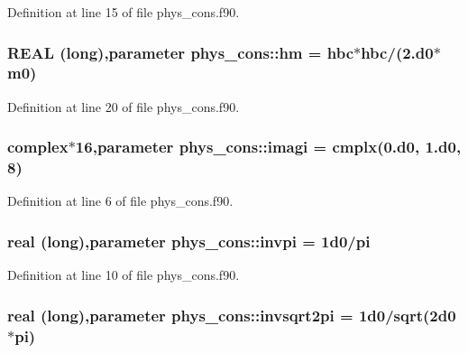 Definition at line 15 of file phys\_\-cons.f90.

\hypertarget{namespacephys__cons_ad97ad749ef4f8f66c56a0facb7394cb5}{
\subsubsection[{hm}]{\setlength{\rightskip}{0pt plus 5cm}REAL (long),parameter {\bf phys\_\-cons::hm} = {\bf hbc}$\ast${\bf hbc}/(2.d0$\ast${\bf m0})}}
\label{namespacephys__cons_ad97ad749ef4f8f66c56a0facb7394cb5}


Definition at line 20 of file phys\_\-cons.f90.

\hypertarget{namespacephys__cons_a0dbb22856790b16e206de451e9cdd74a}{
\subsubsection[{imagi}]{\setlength{\rightskip}{0pt plus 5cm}complex$\ast$16,parameter {\bf phys\_\-cons::imagi} = cmplx(0.d0, 1.d0, 8)}}
\label{namespacephys__cons_a0dbb22856790b16e206de451e9cdd74a}


Definition at line 6 of file phys\_\-cons.f90.

\hypertarget{namespacephys__cons_aa8683f00f4216acc1822dfcb85b1ee00}{
\subsubsection[{invpi}]{\setlength{\rightskip}{0pt plus 5cm}real (long),parameter {\bf phys\_\-cons::invpi} = 1d0/pi}}
\label{namespacephys__cons_aa8683f00f4216acc1822dfcb85b1ee00}


Definition at line 10 of file phys\_\-cons.f90.

\hypertarget{namespacephys__cons_a369d33713444a99a71f80a74c0652d4e}{
\subsubsection[{invsqrt2pi}]{\setlength{\rightskip}{0pt plus 5cm}real (long),parameter {\bf phys\_\-cons::invsqrt2pi} = 1d0/sqrt(2d0$\ast$pi)}}
\label{namespacephys__cons_a369d33713444a99a71f80a74c0652d4e}


